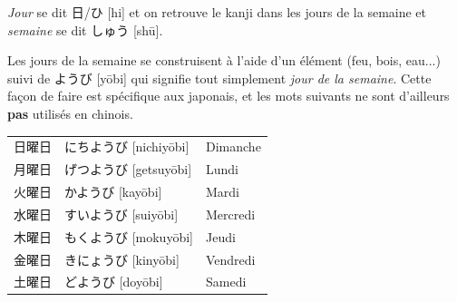 \documentclass[a4paper,11pt,final]{article}
\newcommand{\sectit}[1]{\bigskip\hspace{-5mm}{\color{sectionblue}$\blacksquare$~~\Large\bfseries #1}}
\newcommand{\romaji}[1]{{\footnotesize[#1]}}
\begin{document}

\vspace{15mm}
	

\og\textit{Jour}\fg{} se dit 日/ひ \romaji{hi} et on retrouve le kanji dans les jours de la semaine et \og\textit{semaine}\fg{} se dit しゅう \romaji{sh\=u}.


\sectit{De dimanche à samedi}

Les jours de la semaine se construisent à l'aide d'un élément (feu, bois, eau...) suivi de ようび \romaji{y\=obi} qui signifie tout simplement \og\textit{jour de la semaine}\fg. Cette façon de faire est spécifique aux japonais, et les mots suivants ne sont d'ailleurs \textbf{pas} utilisés en chinois.

\hspace{5mm}\begin{tabular}{|p{2cm}p{4.5cm}l}
	日曜日			& にちようび \romaji{nichiy\=obi}			& Dimanche \\
	月曜日			& げつようび \romaji{getsuy\=obi}			& Lundi \\
	火曜日			& かようび \romaji{kay\=obi}				& Mardi \\
	水曜日			& すいようび \romaji{suiy\=obi}			& Mercredi \\
	木曜日			& もくようび \romaji{mokuy\=obi}			& Jeudi \\
	金曜日			& きにょうび \romaji{kiny\=obi}			& Vendredi \\
	土曜日			& どようび \romaji{doy\=obi}				& Samedi
\end{tabular}
\end{document}
